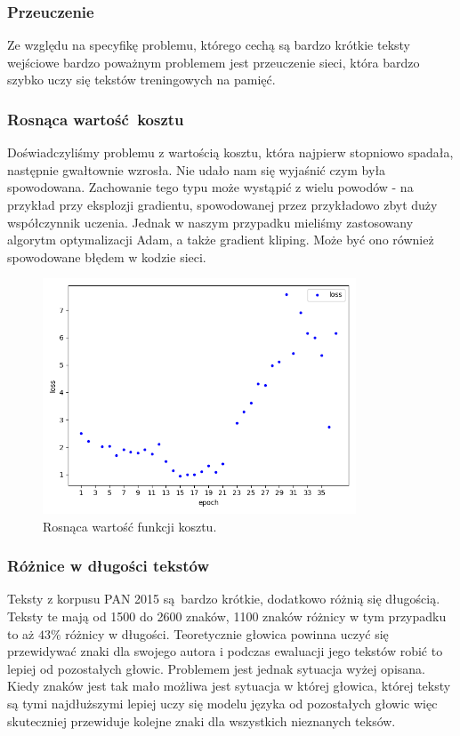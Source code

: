\subsubsection{Przeuczenie}
Ze względu na specyfikę problemu, którego cechą są bardzo krótkie teksty wejściowe bardzo poważnym
problemem jest przeuczenie sieci, która bardzo szybko uczy się tekstów treningowych na pamięć.

\subsubsection{Rosnąca wartość kosztu}
Doświadczyliśmy problemu z wartością kosztu, która najpierw stopniowo spadała, następnie gwałtownie wzrosła.
Nie udało nam się wyjaśnić czym była spowodowana. Zachowanie tego typu może wystąpić z wielu powodów - na przykład przy eksplozji gradientu,
spowodowanej przez przykładowo zbyt duży współczynnik uczenia. Jednak w naszym przypadku mieliśmy zastosowany
algorytm optymalizacji Adam, a także gradient kliping. Może być ono również spowodowane błędem w kodzie sieci.
\begin{figure}[H]
	\centering
	\includegraphics[height=7cm]{./images/exploading_gradient.png}
	\caption{Rosnąca wartość funkcji kosztu.}
	\label{fig:test5}
\end{figure}

\subsubsection{Różnice w długości tekstów}
Teksty z korpusu PAN 2015 \cite{pan} są bardzo krótkie, dodatkowo różnią się długością. Teksty te mają od 1500 do 2600 znaków, 1100 znaków
różnicy w tym przypadku to aż $43\%$ różnicy w długości. Teoretycznie głowica powinna uczyć się przewidywać znaki dla
swojego autora i podczas ewaluacji jego tekstów robić to lepiej od pozostałych głowic. Problemem jest
 jednak sytuacja wyżej opisana. Kiedy znaków jest tak mało
możliwa jest sytuacja w której głowica, której teksty są tymi najdłuższymi lepiej uczy się modelu języka od
pozostałych głowic więc skuteczniej przewiduje kolejne znaki dla wszystkich nieznanych teksów.

